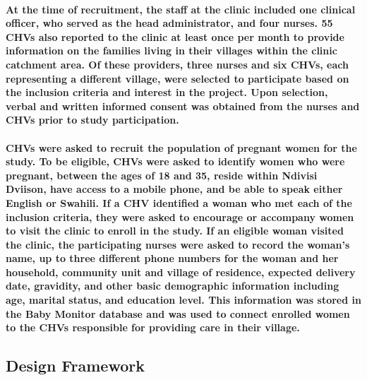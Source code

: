 \paragraph{At the time of recruitment, the staff at the clinic included one clinical officer, who served as the head administrator, and four nurses. 55 CHVs also reported to the clinic at least once per month to provide information on the families living in their villages within the clinic catchment area. Of these providers, three nurses and six CHVs, each representing a different village, were selected to participate based on the inclusion criteria and interest in the project. Upon selection, verbal and written informed consent was obtained from the nurses and CHVs prior to study participation.}

\paragraph{CHVs were asked to recruit the population of pregnant women for the study. To be eligible, CHVs were asked to identify women who were pregnant, between the ages of 18 and 35, reside within Ndivisi Dviison, have access to a mobile phone, and be able to speak either English or Swahili. If a CHV identified a woman who met each of the inclusion criteria, they were asked to encourage or accompany women to visit the clinic to enroll in the study. If an eligible woman visited the clinic, the participating nurses were asked to record the woman's name, up to three different phone numbers for the woman and her household,  community unit and village of residence, expected delivery date, gravidity, and other basic demographic information including age, marital status, and education level. This information was stored in the Baby Monitor database and was used to connect enrolled women to the CHVs responsible for providing care in their village.}

\subsection{Design Framework}
